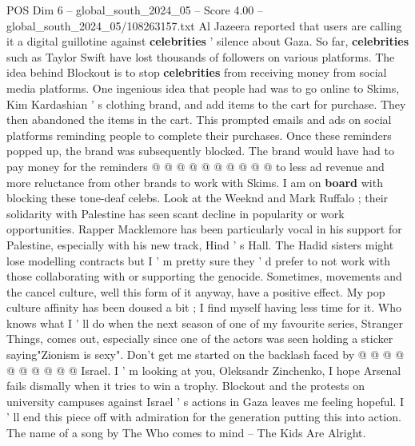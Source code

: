 \begin{textsample}{POS Dim 6 – global\_south\_2024\_05 – Score 4.00 – global\_south\_2024\_05/108263157.txt}
Al Jazeera reported that users are calling it a digital guillotine against \textbf{celebrities} ' silence about Gaza.
So far, \textbf{celebrities} such as Taylor Swift have lost thousands of followers on various platforms.
The idea behind Blockout is to stop \textbf{celebrities} from receiving money from social media platforms.
One ingenious idea that people had was to go online to Skims, Kim Kardashian ' s clothing brand, and add items to the cart for purchase.
They then abandoned the items in the cart.
This prompted emails and ads on social platforms reminding people to complete their purchases.
Once these reminders popped up, the brand was subsequently blocked.
The brand would have had to pay money for the reminders @ @ @ @ @ @ @ @ @ @ to less ad revenue and more reluctance from other brands to work with Skims.
I am on \textbf{board} with blocking these tone-deaf celebs.
Look at the Weeknd and Mark Ruffalo ; their solidarity with Palestine has seen scant decline in popularity or work opportunities.
Rapper Macklemore has been particularly vocal in his support for Palestine, especially with his new track, Hind ' s Hall.
The Hadid sisters might lose modelling contracts but I ' m pretty sure they ' d prefer to not work with those collaborating with or supporting the genocide.
Sometimes, movements and the cancel culture, well this form of it anyway, have a positive effect.
My pop culture affinity has been doused a bit ; I find myself having less time for it.
Who knows what I ' ll do when the next season of one of my favourite series, Stranger Things, comes out, especially since one of the actors was seen holding a sticker saying"Zionism is sexy".
Don't get me started on the backlash faced by @ @ @ @ @ @ @ @ @ @ Israel.
I ' m looking at you, Oleksandr Zinchenko, I hope Arsenal fails dismally when it tries to win a trophy.
Blockout and the protests on university campuses against Israel ' s actions in Gaza leaves me feeling hopeful.
I ' ll end this piece off with admiration for the generation putting this into action.
The name of a song by The Who comes to mind -- The Kids Are Alright.

\end{textsample}
